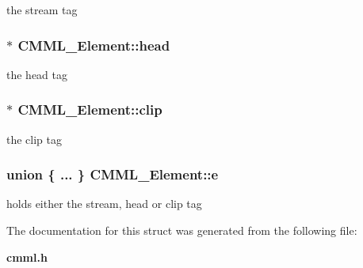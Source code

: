 the stream tag 
\subsubsection{$\ast$ {\bf CMML\_\-Element::head}}\label{structCMML__Element_o2}


the head tag 
\subsubsection{$\ast$ {\bf CMML\_\-Element::clip}}\label{structCMML__Element_o3}


the clip tag 
\subsubsection{\setlength{\rightskip}{0pt plus 5cm}union \{ ... \}   {\bf CMML\_\-Element::e}}\label{structCMML__Element_o4}


holds either the stream, head or clip tag 

The documentation for this struct was generated from the following file:\begin{CompactItemize}
\item 
{\bf cmml.h}\end{CompactItemize}
